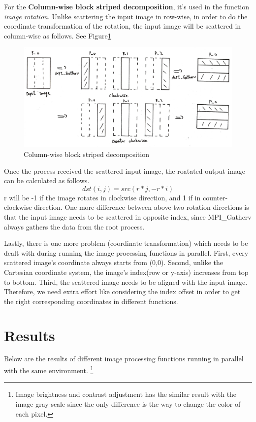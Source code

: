 \documentclass[12pt]{diazessay}
\begin{document}
For the \textbf{Column-wise block striped decomposition}, it's used in the function \textit{image rotation}. Unlike scattering the input image in row-wise, in order to do the coordinate transformation of the rotation, the input image will be scattered in column-wise as follows. See Figure\ref{col_wise}
\newline
\begin{figure}[h]
    \centering
	\includegraphics[scale=0.6, clip]{pics/col_wise.jpg}
	\caption {Column-wise block striped decomposition}
	\label{col_wise}
\end{figure}
\newline
Once the process received the scattered input image, the roatated output image can be calculated as follows. $$dst(i,j)=src(r*j,-r*i)$$ r will be -1 if the image rotates in clockwise direction, and 1 if in counter-clockwise direction. One more difference between above two rotation directions is that the input image needs to be scattered in opposite index, since MPI\_Gatherv always gathers the data from the root process.

Lastly, there is one more problem (coordinate transformation) which needs to be dealt with during running the image processing functions in parallel. First, every scattered image's coordinate always starts from (0,0). Second, unlike the Cartesian coordinate system, the image's index(row or y-axis) increases from top to bottom. Third, the scattered image needs to be aligned with the input image. Therefore, we need extra effort like considering the index offset in order to get the right corresponding coordinates in different functions.   
\clearpage
\section*{Results}

Below are the results of different image processing functions running in parallel with the same environment. \footnote{Image brightness and contrast adjustment has the similar result with the image gray-scale since the only difference is the way to change the color of each pixel.}
\end{document}

